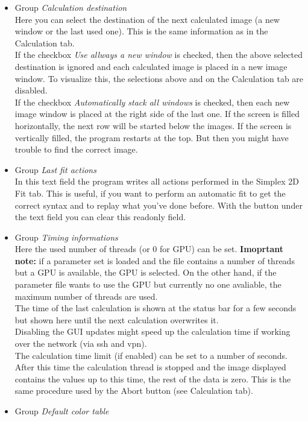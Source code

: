 \documentclass[11pt]{article} %
\begin{document}
\begin{itemize}\itemsep0pt
\item Group {\it Calculation destination} \\
	Here you can select the destination of the next calculated image (a new window or the last used one). This is the same information as in the Calculation tab. \\
	If the checkbox {\it Use allways a new window} is checked, then the above selected destination is ignored and each calculated image is placed in a new image window. To visualize this, the selections above and on the Calculation tab are disabled. \\
	If the checkbox {\it Automatically stack all windows} is checked, then each new image window is placed at the right side of the last one. If the screen is filled horizontally, the next row will be started below the images. If the screen is vertically filled, the program restarts at the top. But then you might have trouble to find the correct image.
\item Group {\it Last fit actions} \\
	In this text field the program writes all actions performed in the Simplex 2D Fit tab. This is useful, if you want to perform an automatic fit to get the correct syntax and to replay what you've done before. With the button under the text field you can clear this readonly field.
\item Group {\it Timing informations} \\
	Here the used number of threads (or 0 for GPU) can be set. {\bf Imoprtant note:} if a parameter set is loaded and the file contains a number of threads but a GPU is available, the GPU is selected. On the other hand, if the parameter file wants to use the GPU but currently no one avaliable, the maximum number of threads are used. \\
	The time of the last calculation is shown at the status bar for a few seconds but shown here until the next calculation overwrites it. \\
	Disabling the GUI updates might speed up the calculation time if working over the network (via ssh and vpn). \\
	The calculation time limit (if enabled) can be set to a number of seconds. After this time the calculation thread is stopped and the image displayed contains the values up to this time, the rest of the data is zero. This is the same procedure used by the Abort button (see Calculation tab).
\item Group {\it Default color table} \\

\end{itemize}
\end{document}
